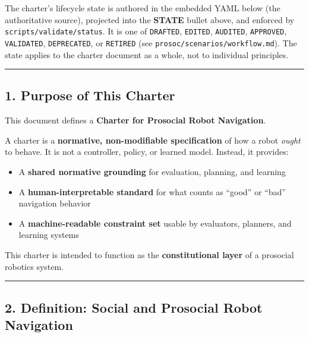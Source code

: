 \documentclass[utf8]{frontiers_suppmat} %
\newenvironment{Shaded}{\begin{shaded}}{\end{shaded}}
\providecommand{\tightlist}{%
  \setlength{\itemsep}{0pt}\setlength{\parskip}{0pt}}
\begin{document}
The charter's lifecycle state is authored in the embedded YAML below
(the authoritative source), projected into the \textbf{STATE} bullet
above, and enforced by \texttt{scripts/validate/status}. It is one of
\texttt{DRAFTED}, \texttt{EDITED}, \texttt{AUDITED}, \texttt{APPROVED},
\texttt{VALIDATED}, \texttt{DEPRECATED}, or \texttt{RETIRED} (see
\texttt{prosoc/scenarios/workflow.md}). The state applies to the charter
document as a whole, not to individual principles.

\begin{Shaded}
\begin{Highlighting}[]
\KeywordTok{:}
\end{Highlighting}
\end{Shaded}

\begin{center}\rule{0.5\linewidth}{0.5pt}\end{center}

\subsection{1. Purpose of This Charter}\label{purpose-of-this-charter}

This document defines a \textbf{Charter for Prosocial Robot Navigation}.

A charter is a \textbf{normative, non-modifiable specification} of how a
robot \emph{ought} to behave. It is not a controller, policy, or learned
model. Instead, it provides:

\begin{itemize}
\tightlist
\item
  A \textbf{shared normative grounding} for evaluation, planning, and
  learning
\item
  A \textbf{human-interpretable standard} for what counts as ``good'' or
  ``bad'' navigation behavior
\item
  A \textbf{machine-readable constraint set} usable by evaluators,
  planners, and learning systems
\end{itemize}

This charter is intended to function as the \textbf{constitutional
layer} of a prosocial robotics system.

\begin{center}\rule{0.5\linewidth}{0.5pt}\end{center}

\subsection{2. Definition: Social and Prosocial Robot
Navigation}\label{definition-social-and-prosocial-robot-navigation}
\end{document}
